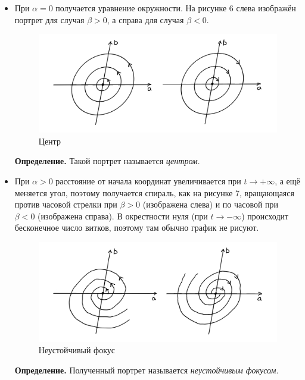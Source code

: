 \begin{itemize}
\item При $\alpha = 0$ получается уравнение окружности. На рисунке 6 слева изображён портрет для случая $\beta > 0$, а справа для случая $\beta < 0$.
\pagebreak

\begin{figure}[h]
    \includegraphics[scale=0.25]{center}
    \centering
    \caption{Центр}
\end{figure}

\textbf{Определение.} Такой портрет называется \textit{центром}.

\item При $\alpha > 0$ расстояние от начала координат увеличивается при $t \to +\infty$, а ещё меняется угол, поэтому получается спираль, как на рисунке 7, вращающаяся против часовой стрелки при $\beta > 0$ (изображена слева) и по часовой при $\beta < 0$ (изображена справа).
В окрестности нуля (при $t \to -\infty$) происходит бесконечное число витков, поэтому там обычно график не рисуют.

\begin{figure}[h]
    \includegraphics[scale=0.25]{unstable-focus}
    \centering
    \caption{Неустойчивый фокус}
\end{figure}

\textbf{Определение.} Полученный портрет называется \textit{неустойчивым фокусом}.


\end{itemize}
